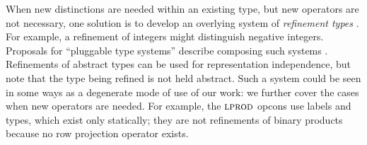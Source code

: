 \documentclass[10pt,preprint]{sigplanconf}
\begin{document}


When new distinctions are needed within an existing type, but new operators are not necessary, one solution is to develop an overlying system of \emph{refinement types} \cite{Freeman91}. For example, a refinement of  integers might distinguish negative integers. Proposals for ``pluggable type systems'' describe composing such   systems \cite{Brac04a,Andreae:2006:FIP:1167473.1167479}. Refinements of abstract types can be used for representation independence, but note that the type being refined is not held abstract. %
Such a system could be seen in some ways as a degenerate mode of use of our work: we further cover the cases when new  operators are needed. 
For example, the $\textsc{lprod}$ opcons use labels and types, which exist only statically; they are not refinements of binary products because no row projection operator exists. %
\end{document}
